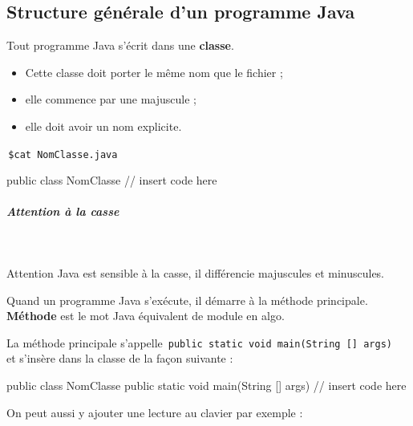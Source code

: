 \documentclass[11pt,a4paper]{article}
\begin{document}
            \par
        \subsection{Structure g\'en\'erale d'un programme Java}
          Tout programme Java s'\'ecrit dans une \textbf{classe}. 
          
					\begin{itemize}
				
			\item Cette classe doit porter le m\^eme nom que le fichier ;
			\item elle commence par une majuscule ; 
			\item elle doit avoir un nom explicite.
					\end{itemize}
				
            \par
        \,\verb|$cat NomClasse.java|\,
            \par
        \begin{Java}
public class NomClasse {
    // insert code here
}
        \end{Java}
			
		\subparagraph{Attention \`a la casse} 
		
					\textcolor{white}{.} \par
				
            \par
        
          Attention Java est sensible \`a la casse, il diff\'erencie majuscules et minuscules.
        
            \par
        
          Quand un programme Java s'ex\'ecute, il d\'emarre \`a la m\'ethode principale.
          \textbf{M\'ethode} est le mot Java \'equivalent de module en algo.
        
            \par
        
          La m\'ethode principale s'appelle \,\verb|public static void main(String [] args) |\, et s'ins\`ere dans la classe de la fa\c con suivante :
        
            \par
        \begin{Java}
public class NomClasse {
    public static void main(String [] args) {
        // insert code here
    }
}
        \end{Java}
          On peut aussi y ajouter une lecture au clavier par exemple :
        
\end{document}
